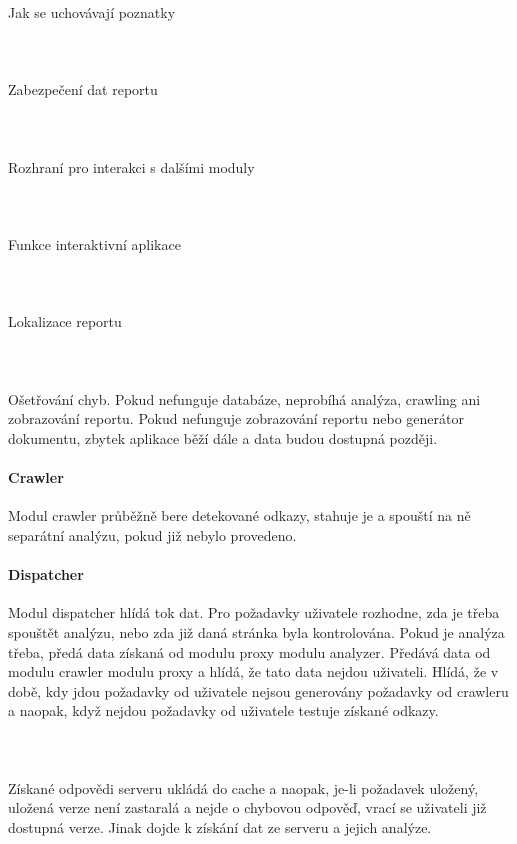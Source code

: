 \documentclass[10pt]{article}
\begin{document}
\paragraph{~}Jak se uchovávají poznatky
\paragraph{~}Zabezpečení dat reportu
\paragraph{~}Rozhraní pro interakci s dalšími moduly
\paragraph{~}Funkce interaktivní aplikace
\paragraph{~}Lokalizace reportu
\paragraph{~}Ošetřování chyb. Pokud nefunguje databáze, neprobíhá analýza, crawling ani zobrazování reportu. Pokud nefunguje zobrazování reportu nebo generátor dokumentu, zbytek aplikace běží dále a data budou dostupná později.
\paragraph{Crawler} Modul crawler průběžně bere detekované odkazy, stahuje je a spouští na ně separátní analýzu, pokud již nebylo provedeno.
\paragraph{Dispatcher} Modul dispatcher hlídá tok dat. Pro požadavky uživatele rozhodne, zda je třeba spouštět analýzu, nebo zda již daná stránka byla kontrolována. Pokud je analýza třeba, předá data získaná od modulu proxy modulu analyzer. Předává data od modulu crawler modulu proxy a hlídá, že tato data nejdou uživateli. Hlídá, že v době, kdy jdou požadavky od uživatele nejsou generovány požadavky od crawleru a naopak, když nejdou požadavky od uživatele testuje získané odkazy. 
\paragraph{~} Získané odpovědi serveru ukládá do cache a naopak, je-li požadavek uložený, uložená verze není zastaralá a nejde o chybovou odpověď, vrací se uživateli již dostupná verze. Jinak dojde k získání dat ze serveru a jejich analýze.
\end{document}
